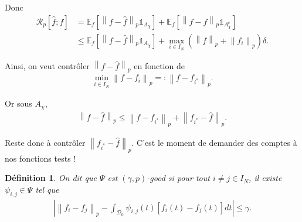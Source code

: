 \documentclass[11pt,letterpaper]{article}
\newtheorem{definition}{Définition}
\begin{document}
\par Donc 
\begin{equation}
	\begin{split}
		\mathcal{R}_p \left[\hat{f}; f \right] & = \mathbb{E}_f \left[ \left\| f - \hat{f} \right\|_p \mathds{1}_{A_\chi} \right] + \mathbb{E}_f \left[ \left\| f - \hat{f} \right\|_p \mathds{1}_{A_\chi^c} \right] \\
		& \leq \mathbb{E}_f \left[ \left\| f - \hat{f} \right\|_p \mathds{1}_{A_\chi} \right] + \max_{i \in I_N} \left( \left\| f \right\|_p + \left\| f_i \right\|_p \right) \delta .
	\end{split}
\end{equation}

\par Ainsi, on veut contrôler $\left\| f - \hat{f} \right\|_p$ en fonction de 
\begin{equation}
	\begin{split}
		\min\limits_{i \in I_N} \left\| f - f_i \right\|_p =: \left\| f - f_{i^*} \right\|_p .
	\end{split}
\end{equation}

\par Or sous $A_\chi$,
\begin{equation}
	\begin{split}
		\left\| f - \hat{f} \right\|_p \leq \left\| f - f_{i^*} \right\|_p + \left\| f_{i^*} - \hat{f} \right\|_p .
	\end{split}
\end{equation}

\par Reste donc à contrôler $\left\| f_{i^*} - \hat{f} \right\|_p$. C'est le moment de demander des comptes à nos fonctions tests !

\begin{definition}
\par On dit que $\Psi$ est $\left( \gamma, p \right)$-good si pour tout $i \neq j \in I_N$, il existe $\psi_{i, j} \in \Psi$ tel que 
\begin{equation}
	\begin{split}
		\left| \left\| f_i - f_j \right\|_p - \int_{\mathcal{D}_0}^{} \psi_{i, j} \left( t \right) \left[ f_i \left( t \right) - f_j \left( t \right) \right] dt \right| \leq \gamma .
	\end{split}
\end{equation}
\end{definition}
\end{document}
